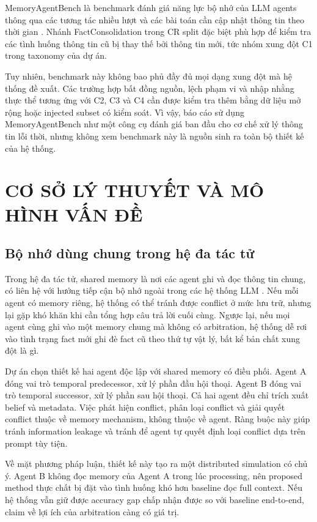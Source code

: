 \documentclass[12pt,a4paper]{article}
\begin{document}
MemoryAgentBench là benchmark đánh giá năng lực bộ nhớ của LLM agents thông qua các tương tác nhiều lượt và các bài toán cần cập nhật thông tin theo thời gian \cite{memoryagentbench,memoryagentbench_dataset}. Nhánh FactConsolidation trong CR split đặc biệt phù hợp để kiểm tra các tình huống thông tin cũ bị thay thế bởi thông tin mới, tức nhóm xung đột C1 trong taxonomy của dự án.

Tuy nhiên, benchmark này không bao phủ đầy đủ mọi dạng xung đột mà hệ thống đề xuất. Các trường hợp bất đồng nguồn, lệch phạm vi và nhập nhằng thực thể tương ứng với C2, C3 và C4 cần được kiểm tra thêm bằng dữ liệu mở rộng hoặc injected subset có kiểm soát. Vì vậy, báo cáo sử dụng MemoryAgentBench như một công cụ đánh giá ban đầu cho cơ chế xử lý thông tin lỗi thời, nhưng không xem benchmark này là nguồn sinh ra toàn bộ thiết kế của hệ thống.

\section{CƠ SỞ LÝ THUYẾT VÀ MÔ HÌNH VẤN ĐỀ}

\subsection{Bộ nhớ dùng chung trong hệ đa tác tử}

Trong hệ đa tác tử, shared memory là nơi các agent ghi và đọc thông tin chung, có liên hệ với hướng tiếp cận bộ nhớ ngoài trong các hệ thống LLM \cite{lewis2020rag,packer2023memgpt}. Nếu mỗi agent có memory riêng, hệ thống có thể tránh được conflict ở mức lưu trữ, nhưng lại gặp khó khăn khi cần tổng hợp câu trả lời cuối cùng. Ngược lại, nếu mọi agent cùng ghi vào một memory chung mà không có arbitration, hệ thống dễ rơi vào tình trạng fact mới ghi đè fact cũ theo thứ tự vật lý, bất kể bản chất xung đột là gì.

Dự án chọn thiết kế hai agent độc lập với shared memory có điều phối. Agent A đóng vai trò temporal predecessor, xử lý phần đầu hội thoại. Agent B đóng vai trò temporal successor, xử lý phần sau hội thoại. Cả hai agent đều chỉ trích xuất belief và metadata. Việc phát hiện conflict, phân loại conflict và giải quyết conflict thuộc về memory mechanism, không thuộc về agent. Ràng buộc này giúp tránh information leakage và tránh để agent tự quyết định loại conflict dựa trên prompt tùy tiện.

Về mặt phương pháp luận, thiết kế này tạo ra một distributed simulation có chủ ý. Agent B không đọc memory của Agent A trong lúc processing, nên proposed method thực chất bị đặt vào tình huống khó hơn baseline đọc full context. Nếu hệ thống vẫn giữ được accuracy gap chấp nhận được so với baseline end-to-end, claim về lợi ích của arbitration càng có giá trị.
\end{document}
